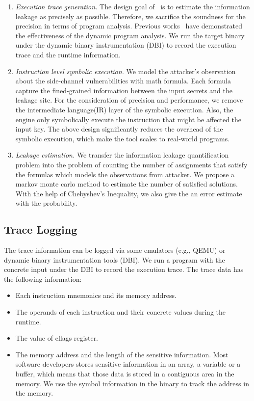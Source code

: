 \begin{enumerate}
    \item \emph{Execution trace generation.} The design goal of \tool\ is to
    estimate the information leakage as precisely as possible. Therefore,
    we sacrifice the soundness for the precision in terms of program analysis.
    Previous works~\cite{203878,217537} have demonstrated the effectiveness of the
    dynamic program analysis. We run the target binary under the dynamic binary
    instrumentation (DBI) to record the execution trace and the runtime information.
    \item \emph{Instruction level symbolic execution.} We model the 
    attacker's observation about the side-channel vulnerabilities with math
    formula. Each formula capture the fined-grained information between the input secrets
    and the leakage site. For the consideration of precision and performance, 
    we remove the intermediate language(IR) layer of the symbolic execution. 
    Also, the engine only symbolically execute the instruction that might be affected the
    input key. The above design significantly reduces the overhead of the symbolic
    execution, which make the tool scales to real-world programs.
    \item \emph{Leakage estimation.} We transfer the information leakage quantification
    problem into the problem of counting the number of assignments that satisfy the formulas
    which models the observations from attacker. We propose a markov monte carlo method to 
    estimate the number of satisfied solutions. With the help of Chebyshev's Inequality,
    we also give the an error estimate with the probability.
\end{enumerate}


\subsection{Trace Logging}
The trace information can be logged via some emulators (e.g., QEMU) or 
dynamic binary instrumentation tools (DBI). 
We run a program with the concrete input under the DBI to record the
execution trace.
The trace data has the following information:
\begin{itemize}
    \item Each instruction mnemonics and its memory address.
    \item The operands of each instruction and their concrete values during the 
          runtime.
    \item The value of eflags register. 
    \item The memory address and the length of the sensitive information.
     Most software developers stores sensitive information in an array,
     a variable or a buffer, which means that those data is stored in a contiguous 
     area in the memory. We use the symbol information in the binary to track the 
     address in the memory.
\end{itemize}

